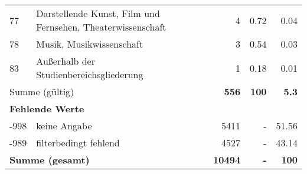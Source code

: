 \begin{longtable}{lXrrr}
        77 & \multicolumn{1}{X}{Darstellende Kunst, Film und Fernsehen, Theaterwissenschaft} & %
          \num{4} &
          \num[round-mode=places,round-precision=2]{0.72} &
          \num[round-mode=places,round-precision=2]{0.04} \\

        78 & \multicolumn{1}{X}{Musik, Musikwissenschaft} & %
          \num{3} &
          \num[round-mode=places,round-precision=2]{0.54} &
          \num[round-mode=places,round-precision=2]{0.03} \\

        83 & \multicolumn{1}{X}{Außerhalb der Studienbereichsgliederung} & %
          \num{1} &
          \num[round-mode=places,round-precision=2]{0.18} &
          \num[round-mode=places,round-precision=2]{0.01} \\

     \midrule
     \multicolumn{2}{l}{Summe (gültig)} &
       \textbf{\num{556}} &
     \textbf{\num{100}} &
       \textbf{\num[round-mode=places,round-precision=2]{5.3}} \\
     \multicolumn{5}{l}{\textbf{Fehlende Werte}}\\
       -998 &
       keine Angabe &
         \num{5411} &
        - &
         \num[round-mode=places,round-precision=2]{51.56} \\
       -989 &
       filterbedingt fehlend &
         \num{4527} &
        - &
         \num[round-mode=places,round-precision=2]{43.14} \\
     \midrule
     \multicolumn{2}{l}{\textbf{Summe (gesamt)}} &
          \textbf{\num{10494}} &
        \textbf{-} &
        \textbf{\num{100}} \\
     \bottomrule
     \end{longtable}
     
